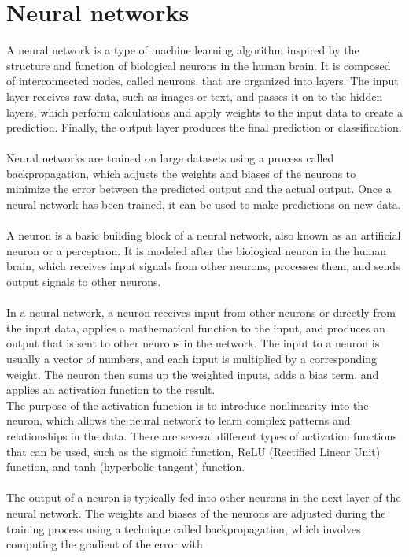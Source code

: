 \section{Neural networks} \label{sec:nn}
A neural network is a type of machine learning algorithm inspired by the structure and function of biological neurons in the human brain.
It is composed of interconnected nodes, called neurons, that are organized into layers. The input layer receives raw data, such as images or text, and
passes it on to the hidden layers, which perform calculations and apply weights to the input data to create a prediction. Finally, the output layer
produces the final prediction or classification.\\
\\
Neural networks are trained on large datasets using a process called backpropagation, which adjusts the weights and biases of the neurons to minimize the
error between the predicted output and the actual output. Once a neural network has been trained, it can be used to make predictions on new data.\\
\\
A neuron is a basic building block of a neural network, also known as an artificial neuron or a perceptron.
It is modeled after the biological neuron in the human brain, which receives input signals from other neurons, processes them, and sends output
signals to other neurons.\\
\\
In a neural network, a neuron receives input from other neurons or directly from the input data, applies a mathematical function to the input, and
produces an output that is sent to other neurons in the network. The input to a neuron is usually a vector of numbers, and each input is multiplied
by a corresponding weight. The neuron then sums up the weighted inputs, adds a bias term, and applies an activation function to the result.\\
The purpose of the activation function is to introduce nonlinearity into the neuron, which allows the neural network to learn complex
patterns and relationships in the data. There are several different types of activation functions that can be used, such as the sigmoid function,
ReLU (Rectified Linear Unit) function, and tanh (hyperbolic tangent) function.\\
\\
The output of a neuron is typically fed into other neurons in the next layer of the neural network. The weights and biases of the neurons are
adjusted during the training process using a technique called backpropagation, which involves computing the gradient of the error with
